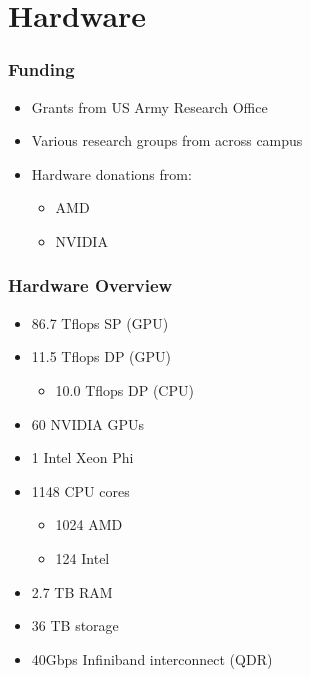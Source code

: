 \section{Hardware}

\begin{frame}\frametitle{Funding}

\begin{itemize}
\itemsep1pt\parskip0pt
\item
  Grants from US Army Research Office
\item
  Various research groups from across campus
\item
  Hardware donations from:

  \begin{itemize}
  \itemsep1pt\parskip0pt
  \item
    AMD
  \item
    NVIDIA
  \end{itemize}
\end{itemize}

\end{frame}

\begin{frame}\frametitle{Hardware Overview}

\begin{itemize}
\itemsep1pt\parskip0pt
\item
  86.7 Tflops SP (GPU)
\item
  11.5 Tflops DP (GPU)

  \begin{itemize}
  \itemsep1pt\parskip0pt
  \item
    10.0 Tflops DP (CPU)
  \end{itemize}
\item
  60 NVIDIA GPUs
\item
  1 Intel Xeon Phi
\item
  1148 CPU cores

  \begin{itemize}
  \itemsep1pt\parskip0pt
  \item
    1024 AMD
  \item
    124 Intel
  \end{itemize}
\item
  2.7 TB RAM
\item
  36 TB storage
\item
  40Gbps Infiniband interconnect (QDR)
\end{itemize}

\end{frame}

